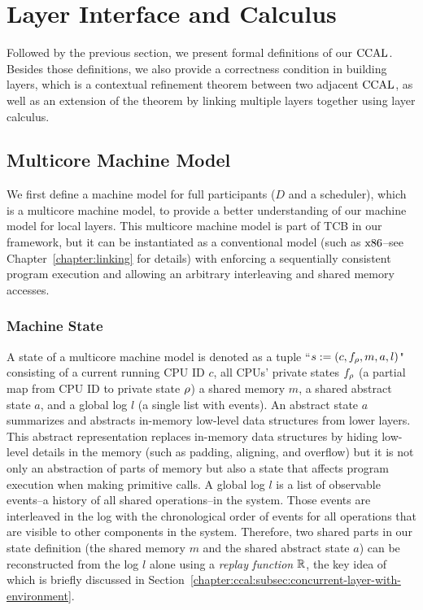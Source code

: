 \section{Layer Interface and Calculus}
\label{chapter:ccal:sec:interface-calculus}

Followed by the previous section, 
we present formal definitions of our $\mathrm{CCAL}$.
Besides those definitions, 
we also provide a correctness condition in building layers, which is 
a contextual refinement theorem between two adjacent $\mathrm{CCAL}$,
as well as an extension of the theorem by linking multiple layers together using layer calculus.


\subsection{Multicore Machine Model}
\label{chapter:ccal:subsec:multicore-machine-model}


We first define a machine model for full participants ($D$ and  a scheduler), which is a multicore machine model, 
to provide a better understanding of our machine model for local layers.
This multicore machine model is part of TCB in our framework, but it can be instantiated as a conventional model (such as $\mathrm{x86}$--see Chapter~\ref{chapter:linking} for  details) with enforcing a sequentially consistent program
execution and allowing an arbitrary interleaving
and shared memory accesses. 


\subsubsection{Machine State} 
A state of a  multicore machine model is denoted as a tuple ``$s := (c, f_{\rho}, m, a, l)$"
consisting of
 a current running CPU ID $c$,
all CPUs' private states $f_\rho$ (a partial map from CPU ID to  private state $\rho$)
 a shared memory $m$,
 a shared abstract state $a$,
and a global log $l$ (a single list with events).
An abstract state $a$ 
summarizes and abstracts in-memory low-level data structures from lower layers. 
This abstract representation replaces
in-memory data structures by hiding low-level details in the memory (such as padding, aligning, and overflow)
but it is not only an abstraction of parts of memory but also a state that affects program execution when making primitive calls. 
A global log $l$ is a list of observable events--a history of all shared operations--in the system.
Those events are
interleaved in the log with the chronological order of events for all operations that are visible to other components in the system. 
Therefore, 
two shared parts in our state definition (the shared memory $m$  
and the shared abstract state $a$)
can be reconstructed
from the log $l$ alone  using a \emph{replay function} $\mathbb{R}$,
the key idea of which is briefly discussed in Section~\ref{chapter:ccal:subsec:concurrent-layer-with-environment}.


